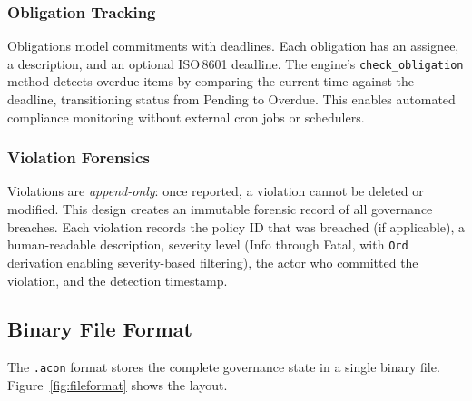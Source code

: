 \documentclass[10pt, twocolumn]{article}
\begin{document}
\subsubsection{Obligation Tracking}

Obligations model commitments with deadlines. Each obligation has an assignee, a description, and an optional ISO\,8601 deadline. The engine's \texttt{check\_obligation} method detects overdue items by comparing the current time against the deadline, transitioning status from Pending to Overdue. This enables automated compliance monitoring without external cron jobs or schedulers.

\subsubsection{Violation Forensics}

Violations are \emph{append-only}: once reported, a violation cannot be deleted or modified. This design creates an immutable forensic record of all governance breaches. Each violation records the policy ID that was breached (if applicable), a human-readable description, severity level (Info through Fatal, with \texttt{Ord} derivation enabling severity-based filtering), the actor who committed the violation, and the detection timestamp.

\subsection{Binary File Format}
\label{sec:format}

The \texttt{.acon} format stores the complete governance state in a single binary file. Figure~\ref{fig:fileformat} shows the layout.
\end{document}
